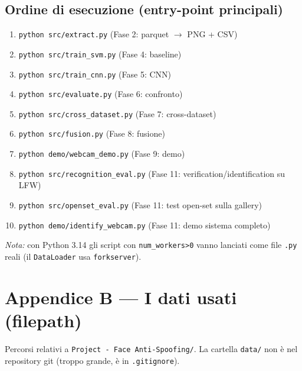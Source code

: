 \documentclass[11pt,a4paper]{article}
\begin{document}
\subsection*{Ordine di esecuzione (entry-point principali)}
\footnotesize
\begin{enumerate}
  \item \texttt{python src/extract.py} \hfill (Fase 2: parquet $\rightarrow$ PNG + CSV)
  \item \texttt{python src/train\_svm.py} \hfill (Fase 4: baseline)
  \item \texttt{python src/train\_cnn.py} \hfill (Fase 5: CNN)
  \item \texttt{python src/evaluate.py} \hfill (Fase 6: confronto)
  \item \texttt{python src/cross\_dataset.py} \hfill (Fase 7: cross-dataset)
  \item \texttt{python src/fusion.py} \hfill (Fase 8: fusione)
  \item \texttt{python demo/webcam\_demo.py} \hfill (Fase 9: demo)
  \item \texttt{python src/recognition\_eval.py} \hfill (Fase 11: verification/identification su LFW)
  \item \texttt{python src/openset\_eval.py} \hfill (Fase 11: test open-set sulla gallery)
  \item \texttt{python demo/identify\_webcam.py} \hfill (Fase 11: demo sistema completo)
\end{enumerate}
\normalsize
\noindent\textit{Nota:} con Python 3.14 gli script con \texttt{num\_workers>0} vanno lanciati come file
\texttt{.py} reali (il \texttt{DataLoader} usa \texttt{forkserver}).

\section{Appendice B --- I dati usati (filepath)}
Percorsi relativi a \texttt{Project - Face Anti-Spoofing/}. La cartella \texttt{data/} non \`e
nel repository git (troppo grande, \`e in \texttt{.gitignore}).
\end{document}
